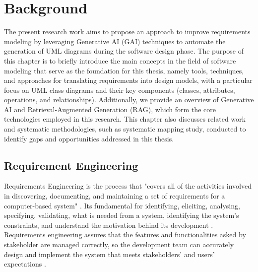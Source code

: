 
%

\chapter{Background}
\label{cha:background}

The present research work aims to propose an approach to improve requirements modeling by leveraging Generative AI (GAI) techniques to automate the generation of UML diagrams during the software design phase. The purpose of this chapter is to briefly introduce the main concepts in the field of software modeling that serve as the foundation for this thesis, namely tools, techniques, and approaches for translating requirements into design models, with a particular focus on UML class diagrams and their key components (classes, attributes, operations, and relationships). Additionally, we provide an overview of Generative AI and Retrieval-Augmented Generation (RAG), which form the core technologies employed in this research. This chapter also discusses related work and systematic methodologies, such as systematic mapping study, conducted to identify gaps and opportunities addressed in this thesis.

\iffalse
\section{Requirement Engineering}
\label{sec:requirement_engineering}

Requirements Engineering is the process that "covers all of the activities involved in discovering, documenting, and maintaining a set of requirements for a computer-based system" \cite{1BKotonya1998}. Its fundamental for identifying, eliciting, analysing, specifying, validating, what is needed from a system, identifying the system's constraints, and understand the motivation behind its development \cite{2BZave1997}. Requirements engineering assures that the features and functionalities asked by stakeholder are managed correctly, so the development team can accurately design and implement the system that meets stakeholders' and users' expectations \cite{3BNuseibeh2000}. 

